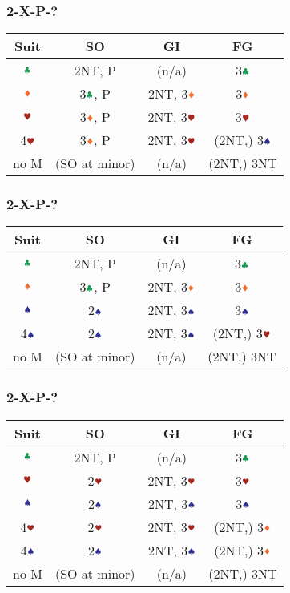 \documentclass{article}
\begin{document}
\begin{multicols}{2}
\begin{CJK*}{UTF8}{gt}
\subsubsection{2\SSS-X-P-?}
\begin{tabular}{c|c|c|c}
    \hline
    Suit & SO & GI & FG \\ \hline\hline
    $\ccc$ & 2NT, P & (n/a) & 3$\ccc$ \\ \hline
    $\ddd$ & 3$\ccc$, P & 2NT, 3$\ddd$ & 3$\ddd$ \\ \hline
    $\hhh$ & 3$\ddd$, P & 2NT, 3$\hhh$ & 3$\hhh$ \\ \hline
    4$\hhh$ & 3$\ddd$, P & 2NT, 3$\hhh$ & (2NT,) 3$\sss$ \\ \hline
    no M & (SO at minor) & (n/a) & (2NT,) 3NT \\ \hline
\end{tabular}

\subsubsection{2\HHH-X-P-?}
\begin{tabular}{c|c|c|c}
    \hline
    Suit & SO & GI & FG \\ \hline\hline
    $\ccc$ & 2NT, P & (n/a) & 3$\ccc$ \\ \hline
    $\ddd$ & 3$\ccc$, P & 2NT, 3$\ddd$ & 3$\ddd$ \\ \hline
    $\sss$ & 2$\sss$ & 2NT, 3$\sss$ & 3$\sss$ \\ \hline
    4$\sss$ & 2$\sss$ & 2NT, 3$\sss$ & (2NT,) 3$\hhh$ \\ \hline
    no M & (SO at minor) & (n/a) & (2NT,) 3NT \\ \hline
\end{tabular}

\subsubsection{2\DDD-X-P-?}
\begin{tabular}{c|c|c|c}
    \hline
    Suit & SO & GI & FG \\ \hline\hline
    $\ccc$ & 2NT, P & (n/a) & 3$\ccc$ \\ \hline
    $\hhh$ & 2$\hhh$ & 2NT, 3$\hhh$ & 3$\hhh$ \\ \hline
    $\sss$ & 2$\sss$ & 2NT, 3$\sss$ & 3$\sss$ \\ \hline
    4$\hhh$ & 2$\hhh$ & 2NT, 3$\hhh$ & (2NT,) 3$\ddd$ \\ \hline
    4$\sss$ & 2$\sss$ & 2NT, 3$\sss$ & (2NT,) 3$\ddd$ \\ \hline
    no M & (SO at minor) & (n/a) & (2NT,) 3NT \\ \hline
\end{tabular}


\end{CJK*}
\end{multicols}
\end{document}
